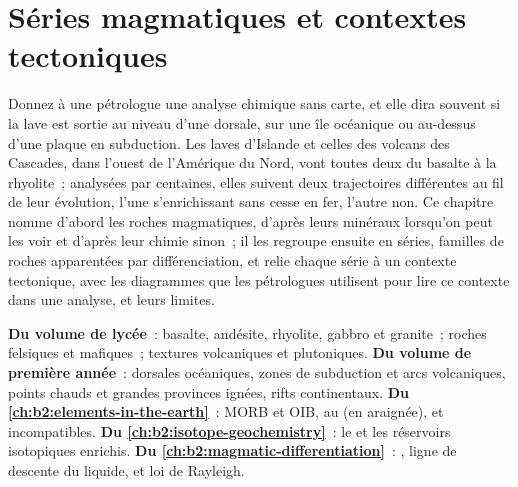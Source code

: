 \chapter{Séries magmatiques et contextes tectoniques}\label{ch:b2:magmatic-series}

Donnez à une pétrologue une analyse chimique sans carte, et elle dira souvent si la
lave est sortie au niveau d'une dorsale, sur une île océanique ou au-dessus d'une plaque
en subduction. Les laves d'Islande et celles des volcans des Cascades, dans l'ouest de
l'Amérique du Nord, vont toutes deux du basalte à la rhyolite~; analysées par centaines,
elles suivent deux trajectoires différentes au fil de leur évolution, l'une s'enrichissant
sans cesse en fer, l'autre non. Ce chapitre nomme d'abord les roches magmatiques, d'après
leurs minéraux lorsqu'on peut les voir et d'après leur chimie sinon~; il les regroupe ensuite
en séries, familles de roches apparentées par différenciation, et relie chaque série à un contexte
tectonique, avec les diagrammes que les pétrologues utilisent pour lire ce contexte dans une analyse, et leurs limites.

\begin{recall}
\textbf{Du volume de lycée}~: basalte, andésite, rhyolite, gabbro et granite~;
roches felsiques et mafiques~; textures volcaniques et plutoniques. \textbf{Du volume de
première année}~: dorsales océaniques, zones de subduction et arcs volcaniques, points chauds
et grandes provinces ignées, rifts continentaux. \textbf{Du \cref{ch:b2:elements-in-the-earth}}~:
MORB et OIB,  au  (en araignée),  et
incompatibles. \textbf{Du \cref{ch:b2:isotope-geochemistry}}~: le  et les
réservoirs isotopiques enrichis. \textbf{Du
\cref{ch:b2:magmatic-differentiation}}~: , ligne de descente du
liquide,  et loi de Rayleigh.
\end{recall}

